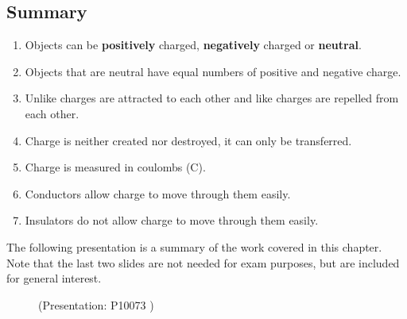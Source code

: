             \subsection{ Summary}
            \nopagebreak
      \label{m38781*id201947}\begin{enumerate}[noitemsep, label=\textbf{\arabic*}. ] 
            \label{m38781*uid14}\item Objects can be \textbf{positively} charged, \textbf{negatively} charged or \textbf{neutral}.
\label{m38781*uid15}\item Objects that are neutral have equal numbers of positive and negative charge.
\label{m38781*uid16}\item Unlike charges are attracted to each other and like charges are repelled from each other.
\label{m38781*uid17}\item Charge is neither created nor destroyed, it can only be transferred.
\label{m38781*uid18}\item Charge is measured in coulombs (C).
\label{m38781*uid19}\item Conductors allow charge to move through them easily.
\label{m38781*uid20}\item Insulators do not allow charge to move through them easily.
\end{enumerate}
        \label{m38781*eip-152}The following presentation is a summary of the work covered in this chapter. Note that the last two slides are not needed for exam purposes, but are included for general interest.\newline
    \setcounter{subfigure}{0}
	\begin{figure}[H] %
    \label{m38781*slidesharemedia}\label{m38781*slideshareflash} { (Presentation:  P10073 )}
      \vspace{2pt}
    \vspace{.1in}
 \end{figure}       \par 
    \label{m38781*cid10}
